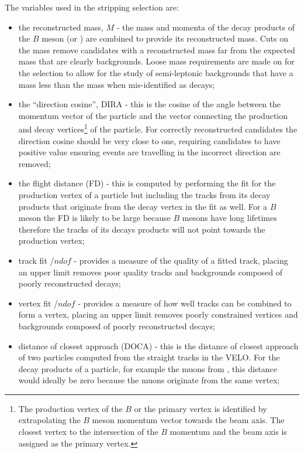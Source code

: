 The variables used in the stripping selection are:
\begin{itemize}
\item the reconstructed mass, $M$ - the mass and momenta of the decay products of the $B$ meson (or \jpsi) are combined to provide its reconstructed mass. Cuts on the mass remove candidates with a reconstructed mass far from the expected mass that are clearly backgrounds. Loose mass requirements are made on for the \bmumu selection to allow for the study of semi-leptonic backgrounds that have a mass less than the \bsd mass when mis-identified as \bmumu decays;
\item the ``direction cosine'', DIRA - this is the cosine of the angle between the momentum vector of the particle and the vector connecting the production and decay vertices\footnote{The production vertex of the $B$ or the primary vertex is identified by extrapolating the $B$ meson momentum vector towards the beam axis. The closest vertex to the intersection of the $B$ momentum and the beam axis is assigned as the primary vertex.} of the particle. For correctly reconstructed candidates the direction cosine should be very close to one, requiring candidates to have positive value ensuring events are travelling in the incorrect direction are removed;
\item the flight distance (FD) \chisqd $ $- this is computed by performing the fit for the production vertex of a particle but including the tracks from its decay products that originate from the decay vertex in the fit as well. For a $B$ meson the FD \chisqd is likely to be large because $B$ mesons have long lifetimes therefore the tracks of its decays products will not point towards the production vertex;
\item track fit \chisqd/$ndof$ - provides a measure of the quality of a fitted track, placing an upper limit removes poor quality tracks and backgrounds composed of poorly reconstructed decays;
\item vertex fit \chisqd/$ndof$ - provides a measure of how well tracks can be combined to form a vertex, placing an upper limit removes poorly constrained vertices and backgrounds composed of poorly reconstructed decays;
\item distance of closest approach (DOCA) - this is the distance of closest approach of two particles computed from the straight tracks in the VELO. For the decay products of a particle, for example the muons from \bmumu, this distance would ideally be zero because the muons originate from the same vertex;

\end{itemize}
